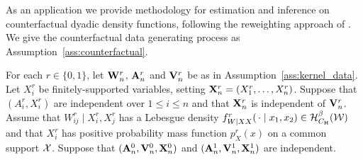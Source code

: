As an application we provide methodology for estimation and inference
on counterfactual dyadic density functions,
following the reweighting approach of
\citet{dinardo1996distribution}.
We give the counterfactual data
generating process as
Assumption~\ref{ass:counterfactual}.

\begin{assumption}
  \label{ass:counterfactual}

  For each $r \in \{0,1\}$,
  let $\mathbf{W}_n^r$, $\mathbf{A}_n^r$ and $\mathbf{V}_n^r$ be as in
  Assumption~\ref{ass:kernel_data}.
  Let $X_i^r$ be finitely-supported variables,
  setting $\mathbf{X}_n^r = (X_1^r, \ldots, X_n^r)$.
  Suppose that $(A_i^r, X_i^r)$ are
  independent over $1 \leq i \leq n$
  and that $\mathbf{X}_n^r$ is independent of $\mathbf{V}_n^r$.
  Assume that $W_{i j}^r \mid X_i^r, X_j^r$
  has a Lebesgue density
  $f_{W \mid XX}^r(\,\cdot \mid x_1, x_2) \in \mathcal{H}^\beta_{C_\mathrm{H}}(\mathcal{W})$
  and that $X_i^r$ has positive
  probability mass function
  $p_X^r(x)$ on a common support $\mathcal{X}$.
  Suppose that
  $(\mathbf{A}_n^0, \mathbf{V}_n^0, \mathbf{X}_n^0)$
  and $(\mathbf{A}_n^1, \mathbf{V}_n^1, \mathbf{X}_n^1)$
  are independent.

\end{assumption}


